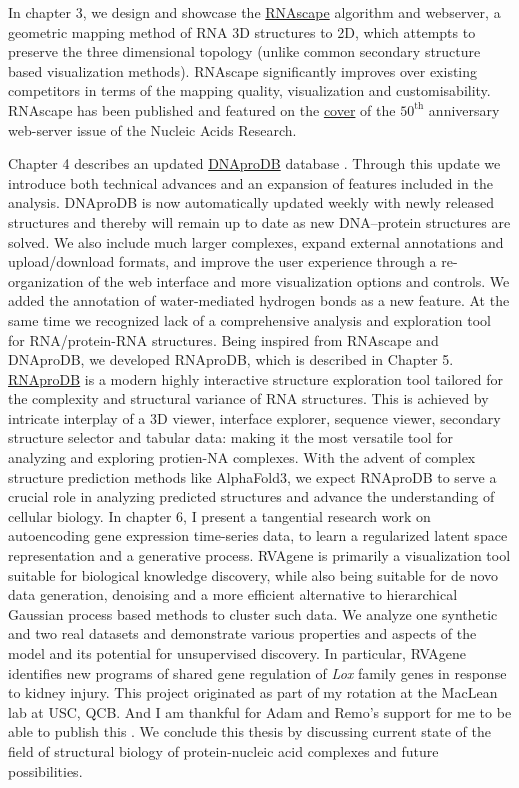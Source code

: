 In chapter 3, we design and showcase the  \href{https://rnascape.usc.edu/}{RNAscape} algorithm and webserver, a geometric mapping method of RNA 3D structures to 2D, which attempts to preserve the three dimensional topology (unlike common secondary structure based visualization methods). RNAscape significantly improves over existing competitors \citep{Yang2003} in terms of the mapping quality, visualization and customisability. RNAscape has been published \citep{Mitra2024rnascape} and featured on the \href{https://academic.oup.com/nar/issue/52/W1}{cover} of the $50^\text{th}$ anniversary web-server issue of the Nucleic Acids Research.

Chapter 4 describes an updated \href{https://dnaprodb.usc.edu}{DNAproDB} database \citep{Sagendorf2017, Sagendorf2020}. Through this update we introduce both technical advances and an expansion of features included in the analysis. DNAproDB is now automatically updated weekly with newly released structures and thereby will remain up to date as new DNA–protein structures are solved. We also include much larger
complexes, expand external annotations and upload/download formats, and improve the user
experience through a re-organization of the web interface and more visualization options and controls. We added the annotation of water-mediated hydrogen bonds as a new feature.
At the same time we recognized lack of a comprehensive analysis and exploration tool for RNA/protein-RNA structures. Being inspired from RNAscape and DNAproDB, we developed RNAproDB, which is described in Chapter 5. \href{https://rohslab.usc.edu/rnaprodb/}{RNAproDB} is a modern highly interactive structure exploration tool tailored for the complexity and structural variance of RNA structures. This is achieved by intricate interplay of a 3D viewer, interface explorer, sequence viewer, secondary structure selector and tabular data:  making it the most versatile tool for analyzing and exploring protien-NA complexes. With the advent of complex structure prediction methods like AlphaFold3, we expect RNAproDB to serve a crucial role in analyzing predicted structures and advance the understanding of cellular biology.
In chapter 6, I present a tangential research work on autoencoding gene expression time-series data, to learn a regularized latent space representation and a generative process. RVAgene is primarily a visualization tool suitable for biological
knowledge discovery, while also being suitable for de novo data generation, denoising and a more
efficient alternative to hierarchical Gaussian process based methods \citep{mcdowell2018} to cluster such data. We
analyze one synthetic and two real datasets and demonstrate various properties and aspects of the
model and its potential for unsupervised discovery.  In particular, RVAgene identifies new programs of
shared gene regulation of \textit{Lox} family genes in response to kidney injury. This project originated as part of my rotation at the MacLean lab at USC, QCB. And I am thankful for Adam and Remo's support for me to be able to publish this \citep{Mitra2021}.
We conclude this thesis by discussing current state of the field of structural biology of protein-nucleic acid complexes and future possibilities.
